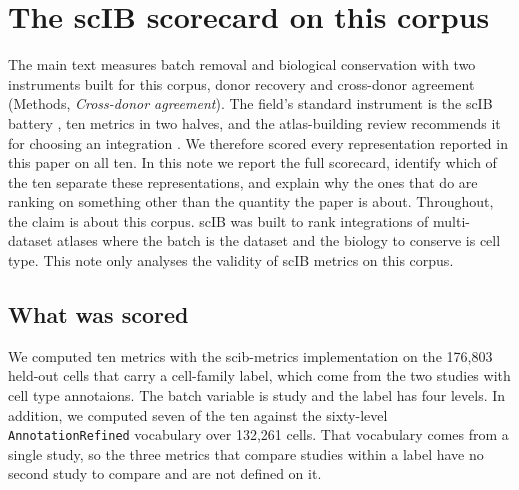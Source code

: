 %
%
%

\section{The scIB scorecard on this corpus}
\label{note:scib}

The main text measures batch removal and biological conservation with two
instruments built for this corpus, donor recovery and cross-donor agreement
(Methods, \emph{Cross-donor agreement}). The field's standard instrument is
the scIB battery \citep{luecken2022benchmarking}, ten metrics in two halves,
and the atlas-building review recommends it for choosing an integration
\citep{hrovatin2025atlases}. We therefore scored every representation reported 
in this paper on all ten. In this note we report the full scorecard, identify
which of the ten separate these representations, and explain why the ones
that do are ranking on something other than the quantity the paper is
about. Throughout, the claim is about this corpus. scIB was built to rank
integrations of multi-dataset atlases where the batch is the dataset and
the biology to conserve is cell type. This note only analyses the validity 
of scIB metrics on this corpus.

\subsection{What was scored}

We computed ten metrics with the scib-metrics implementation on the
176{,}803 held-out cells that carry a cell-family label, which come from
the two studies with cell type annotaions. The batch variable is study
and the label has four levels. In addition, we computed seven of the ten
against the sixty-level \texttt{AnnotationRefined} vocabulary over 132{,}261
cells. That vocabulary comes from a single study, so the three metrics that
compare studies within a label have no second study to compare and are not
defined on it.

